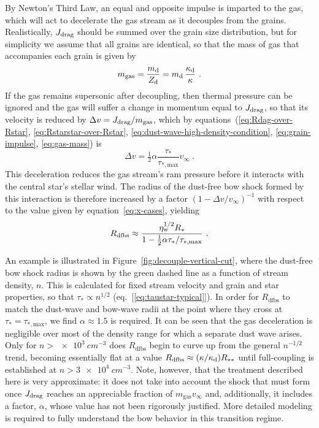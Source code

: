 By Newton's Third Law, an equal and opposite impulse is imparted to
the gas, which will act to decelerate the gas stream as it decouples
from the grains.  Realistically, \(J_{\text{drag}}\) should be summed over the
grain size distribution, but for simplicity we assume that all grains
are identical, so that the mass of gas that accompanies each grain is
given by
\begin{equation}
  \label{eq:gas-mass}
  m_{\text{gas}} = \frac{m_{\text{d}}}{Z_{\text{d}}} =  m_{\text{d}} \, \frac{\kappa_{\text{d}}}{\kappa} \ . 
\end{equation}
If the gas remains supersonic after decoupling, then thermal pressure
can be ignored and the gas will suffer a change in momentum equal to
\(J_{\text{drag}}\), so that its velocity is reduced by
\(\Delta v = J_{\text{drag}} / m_{\text{gas}}\), which by
equations~(\ref{eq:Rdag-over-Rstar}, \ref{eq:Rstarstar-over-Rstar},
\ref{eq:dust-wave-high-density-condition}, \ref{eq:grain-impulse},
\ref{eq:gas-mass}) is
\begin{equation}
  \label{eq:gas-dv}
  \Delta v = \tfrac12 \alpha \frac{\tau_*}{\tau_{*, \text{max}}} v_\infty\ .
\end{equation}
This deceleration reduces the gas stream's ram pressure before it
interacts with the central star's stellar wind.  The radius of the
dust-free bow shock formed by this interaction is therefore increased
by a factor \((1 - \Delta v / v_\infty)^{-1}\) with respect to the value given
by equation~\eqref{eq:x-cases}, yielding
\begin{equation}
  \label{eq:gas-free-bow-shock}
  R_{\text{dfbs}} \approx \frac{\eta_{\text{w}}^{1/2} R_*}{1 - \tfrac12 \alpha \tau_* / \tau_{*, \text{max}}} \ .
\end{equation}

An example is illustrated in Figure~\ref{fig:decouple-vertical-cut},
where the dust-free bow shock radius is shown by the green dashed line
as a function of stream density, \(n\).  This is calculated for fixed
stream velocity and grain and star properties, so that
\(\tau_* \propto n^{1/2}\) (eq.~[\ref{eq:taustar-typical}]).
In order for
\(R_{\text{dfbs}}\) to match the dust-wave and bow-wave radii at the
point where they cross at \(\tau_* = \tau_{*, \text{max}}\), we find
\(\alpha \approx 1.5\) is required.  It can be seen that the gas deceleration is
negligible over most of the density range for which a separate dust
wave arises.  Only for \(n > \SI{e3}{cm^{-3}}\) does
\(R_{\text{dfbs}}\) begin to curve up from the general \(n^{-1/2}\)
trend, becoming essentially flat at a value
\(R_{\text{dfbs}} \approx (\kappa/\kappa_{\text{d}}) R_{**}\) until full-coupling is
established at \(n > \SI{3e4}{cm^{-3}}\).  Note, however, that the
treatment described here is very approximate: it does not take into
account the shock that must form once \(J_{\text{drag}}\) reaches an
appreciable fraction of \(m_{\text{gas}} v_\infty\) and, additionally, it
includes a factor, \(\alpha\), whose value has not been rigorously
justified.  More detailed modeling is required to fully understand the
bow behavior in this transition regime.



